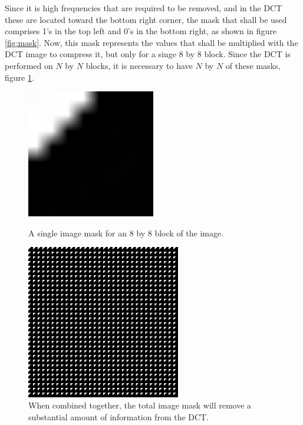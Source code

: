		Since it is high frequencies that are required to be removed, and in the DCT these are located toward the bottom right corner, the mask that shall be used comprises 1's in the top left and 0's in the bottom right, as shown in figure \ref{fig:mask}. Now, this mask represents the values that shall be multiplied with the DCT image to compress it, but only for a singe 8 by 8 block. Since the DCT is performed on $N$ by $N$ blocks, it is necessary to have $N$ by $N$ of these masks, figure \ref{fig:NxN_mask}.
		\begin{figure}[ht]
			\centering
			\begin{minipage}[c]{0.45\linewidth}
				\centering
			 	\includegraphics[width=0.5\textwidth]{mask.jpg}
			 	\caption{A single image mask for an 8 by 8 block of the image.\label{fig:mask}}
			\end{minipage}
			\begin{minipage}[c]{0.45\linewidth}
				\centering
			 	\includegraphics[width=0.6\textwidth]{NxN_mask.jpg}
			 	\caption{When combined together, the total image mask will remove a substantial amount of information from the DCT.\label{fig:NxN_mask}}
			\end{minipage}
		\end{figure}


